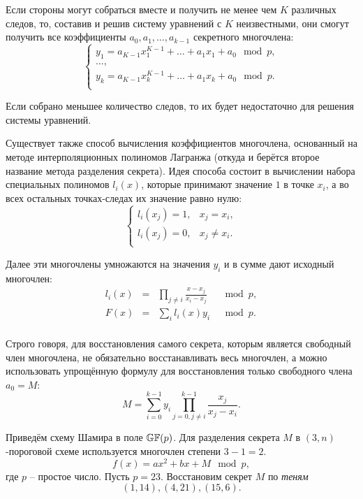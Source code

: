 Если стороны могут собраться вместе и получить не менее чем $K$ различных следов, то, составив и решив систему уравнений с $K$ неизвестными, они смогут получить все коэффициенты $a_0, a_1, \dots, a_{k-1}$ секретного многочлена:
\[ \left\{ \begin{array}{l}
    y_1 = a_{K-1}x_1^{K-1} + \dots + a_1 x_1 + a_0 \mod p, \\
    \dots, \\
    y_k = a_{K-1}x_k^{K-1} + \dots + a_1 x_k + a_0 \mod p. \\
\end{array} \right. \]

Если собрано меньшее количество следов, то их будет недостаточно для решения системы уравнений.

Существует также способ вычисления коэффициентов многочлена, основанный на методе интерполяционных полиномов Лагранжа (откуда и берётся второе название метода разделения секрета). Идея способа состоит в вычислении набора специальных полиномов $l_i \left( x \right)$, которые принимают значение $1$ в точке $x_i$, а во всех остальных точках-следах их значение равно нулю:
\[ \begin{cases}
	l_i \left( x_j \right) = 1, &x_j = x_i, \\
	l_i \left( x_j \right) = 0, &x_j \ne x_i. \\
\end{cases} \]

Далее эти многочлены умножаются на значения $y_i$ и в сумме дают исходный многочлен:
\[\begin{array}{llll}
  l_i \left( x \right) &=& \prod\limits_{j \ne i} {\frac{{x - x_j }}{{x_i  - x_j }}} &\mod p, \\
  F\left( x \right) &=& \sum\limits_i {l_i \left( x \right)y_i } &\mod p. \\
\end{array}\]

Строго говоря, для восстановления самого секрета, которым является свободный член многочлена, не обязательно восстанавливать весь многочлен, а можно использовать упрощённую формулу для восстановления только свободного члена $a_0 = M$:
    \[ M = \sum\limits_{i=0}^{k-1} y_i \prod\limits_{j=0, j \neq i}^{k-1} \frac{x_j}{x_j - x_i}. \]

\example
Приведём схему Шамира в поле $\mathbb{GF}(p)$. Для разделения секрета $M$ в $(3,n)$-пороговой схеме используется многочлен степени $3-1=2$.
    \[ f(x) = a x^2 + b x + M \mod p, \]
где $p$ -- простое число. Пусть $p=23$. Восстановим секрет $M$ по \emph{теням}
    \[ (1,14), (4,21), (15,6). \]

